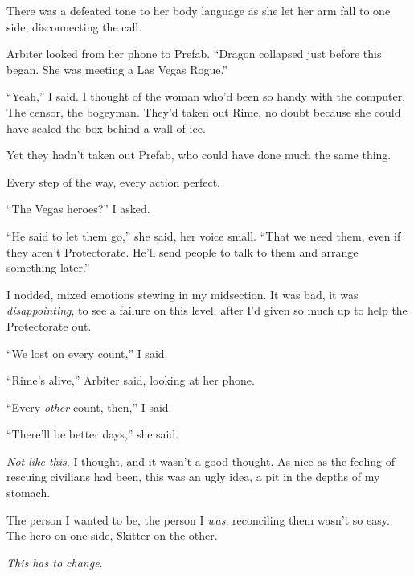 There was a defeated tone to her body language as she let her arm fall to one side, disconnecting the call.



Arbiter looked from her phone to Prefab.  ``Dragon collapsed just before this began.  She was meeting a Las Vegas Rogue.''



``Yeah,'' I said.  I thought of the woman who'd been so handy with the computer.  The censor, the bogeyman.  They'd taken out Rime, no doubt because she could have sealed the box behind a wall of ice.



Yet they hadn't taken out Prefab, who could have done much the same thing.



Every step of the way, every action perfect.



``The Vegas heroes?''  I asked.



``He said to let them go,'' she said, her voice small.  ``That we need them, even if they aren't Protectorate.  He'll send people to talk to them and arrange something later.''



I nodded, mixed emotions stewing in my midsection.  It was bad, it was \emph{disappointing}, to see a failure on this level, after I'd given so much up to help the Protectorate out.



``We lost on every count,'' I said.



``Rime's alive,'' Arbiter said, looking at her phone.



``Every \emph{other} count, then,'' I said.



``There'll be better days,'' she said.



\emph{Not like this}, I thought, and it wasn't a good thought.  As nice as the feeling of rescuing civilians had been, this was an ugly idea, a pit in the depths of my stomach.



The person I wanted to be, the person I \emph{was}, reconciling them wasn't so easy.  The hero on one side, Skitter on the other.



\emph{This has to change}.





